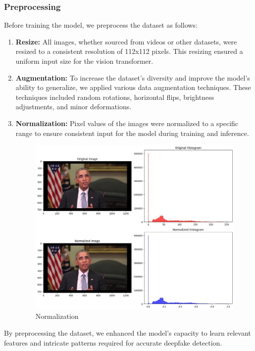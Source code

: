 \subsubsection{Preprocessing}

\noindent Before training the model, we preprocess the dataset as follows:

\begin{enumerate}
    \item \textbf{Resize:} All images, whether sourced from videos or other datasets, were resized to a consistent resolution of 112x112 pixels. This resizing ensured a uniform input size for the vision transformer.

    \item \textbf{Augmentation:} To increase the dataset's diversity and improve the model's ability to generalize, we applied various data augmentation techniques. These techniques included random rotations, horizontal flips, brightness adjustments, and minor deformations.

    \item \textbf{Normalization:} Pixel values of the images were normalized to a specific range to ensure consistent input for the model during training and inference.
          \begin{figure}[htbp]
              \centering
              \includegraphics[width= 5in ]{img/normalized.jpg}
              \caption{Normalization}
          \end{figure}
\end{enumerate}

\noindent By preprocessing the dataset, we enhanced the model's capacity to learn relevant features and intricate patterns required for accurate deepfake detection.
